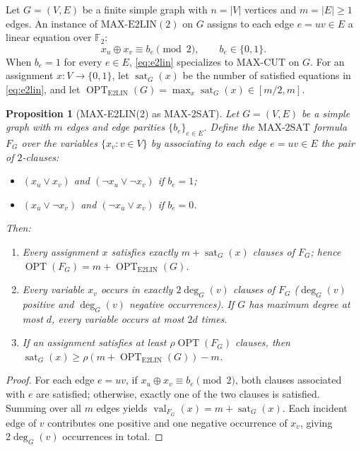 \documentclass[11pt]{amsart}
\newtheorem{proposition}[theorem]{Proposition}
\begin{document}
Let $G=(V,E)$ be a finite simple graph with $n=|V|$ vertices and $m=|E| \ge 1$ edges. An instance of $\mathrm{MAX\text{-}E2LIN}(2)$ on $G$ assigns to each edge $e=uv\in E$ a linear equation over $\mathbb{F}_2$:
\begin{equation}\label{eq:e2lin}
x_u \oplus x_v \equiv b_e \pmod{2}, \qquad b_e \in \{0,1\}.
\end{equation}
When $b_e = 1$ for every $e \in E$, \eqref{eq:e2lin} specializes to $\mathrm{MAX\text{-}CUT}$ on $G$. For an assignment $x : V \to \{0,1\}$, let $\operatorname{sat}_G(x)$ be the number of satisfied equations in \eqref{eq:e2lin}, and let $\operatorname{OPT}_{\mathrm{E2LIN}}(G) = \max_x \operatorname{sat}_G(x) \in [m/2, m]$.

\begin{proposition}[MAX-E2LIN(2) as MAX-2SAT]\label{prop:e2lin2sat}
Let $G=(V,E)$ be a simple graph with $m$ edges and edge parities $\{b_e\}_{e\in E}$. Define the $\mathrm{MAX\text{-}2SAT}$ formula $F_G$ over the variables $\{x_v : v\in V\}$ by associating to each edge $e=uv\in E$ the pair of $2$-clauses:
\begin{itemize}
\item $(x_u \lor x_v)$ and $(\lnot x_u \lor \lnot x_v)$ if $b_e = 1$;
\item $(x_u \lor \lnot x_v)$ and $(\lnot x_u \lor x_v)$ if $b_e = 0$.
\end{itemize}
Then:
\begin{enumerate}
\item Every assignment $x$ satisfies exactly $m + \operatorname{sat}_G(x)$ clauses of $F_G$; hence $\operatorname{OPT}(F_G) = m + \operatorname{OPT}_{\mathrm{E2LIN}}(G)$.
\item Every variable $x_v$ occurs in exactly $2\deg_G(v)$ clauses of $F_G$ ($\deg_G(v)$ positive and $\deg_G(v)$ negative occurrences). If $G$ has maximum degree at most $d$, every variable occurs at most $2d$ times.
\item If an assignment satisfies at least $\rho \operatorname{OPT}(F_G)$ clauses, then $\operatorname{sat}_G(x) \ge \rho(m + \operatorname{OPT}_{\mathrm{E2LIN}}(G)) - m$.
\end{enumerate}
\end{proposition}

\begin{proof}
For each edge $e=uv$, if $x_u \oplus x_v \equiv b_e \pmod{2}$, both clauses associated with $e$ are satisfied; otherwise, exactly one of the two clauses is satisfied. Summing over all $m$ edges yields $\operatorname{val}_{F_G}(x) = m + \operatorname{sat}_G(x)$. Each incident edge of $v$ contributes one positive and one negative occurrence of $x_v$, giving $2\deg_G(v)$ occurrences in total.
\end{proof}
\end{document}
